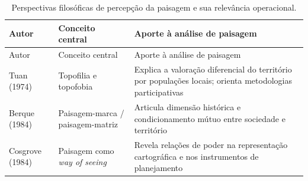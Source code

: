 \documentclass[
  portuguese,
  11pt,
  a4paper,
  open=any]{scrbook}
\begin{document}
\begin{longtable}[]{@{}
  >{\raggedright\arraybackslash}p{}
  >{\raggedright\arraybackslash}p{}
  >{\raggedright\arraybackslash}p{}@{}}
\caption{Perspectivas filosóficas de percepção da paisagem e sua
relevância operacional.}\label{tbl-percepcao-autores}\tabularnewline
\toprule\noalign{}
\begin{minipage}[b]{\linewidth}\raggedright
Autor
\end{minipage} & \begin{minipage}[b]{\linewidth}\raggedright
Conceito central
\end{minipage} & \begin{minipage}[b]{\linewidth}\raggedright
Aporte à análise de paisagem
\end{minipage} \\
\midrule\noalign{}
\endfirsthead
\toprule\noalign{}
\begin{minipage}[b]{\linewidth}\raggedright
Autor
\end{minipage} & \begin{minipage}[b]{\linewidth}\raggedright
Conceito central
\end{minipage} & \begin{minipage}[b]{\linewidth}\raggedright
Aporte à análise de paisagem
\end{minipage} \\
\midrule\noalign{}
\endhead
\bottomrule\noalign{}
\endlastfoot
Tuan (1974) & Topofilia e topofobia & Explica a valoração diferencial do
território por populações locais; orienta metodologias participativas \\
Berque (1984) & Paisagem-marca / paisagem-matriz & Articula dimensão
histórica e condicionamento mútuo entre sociedade e território \\
Cosgrove (1984) & Paisagem como \emph{way of seeing} & Revela relações
de poder na representação cartográfica e nos instrumentos de
planejamento \\
\end{longtable}
\end{document}
